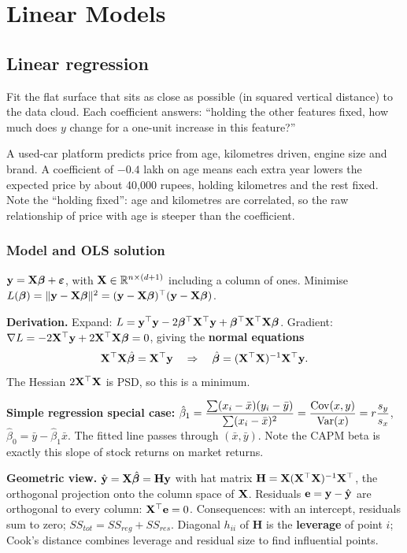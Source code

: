 \chapter{Linear Models}
\label{ch:linear}

\section{Linear regression}

\begin{intuition}
Fit the flat surface that sits as close as possible (in squared vertical distance) to the data cloud. Each coefficient answers: ``holding the other features fixed, how much does $y$ change for a one-unit increase in this feature?''
\end{intuition}

\begin{realworld}
A used-car platform predicts price from age, kilometres driven, engine size and brand. A coefficient of $-0.4$ lakh on age means each extra year lowers the expected price by about 40{,}000 rupees, holding kilometres and the rest fixed. Note the ``holding fixed'': age and kilometres are correlated, so the raw relationship of price with age is steeper than the coefficient.
\end{realworld}

\subsection{Model and OLS solution}
$\mathbf{y}=\mathbf{X}\bm{\beta}+\bm\varepsilon$, with $\mathbf{X}\in\mathbb{R}^{n\times(d+1)}$ including a column of ones. Minimise $L(\bm{\beta})=\|\mathbf{y}-\mathbf{X}\bm{\beta}\|^2=(\mathbf{y}-\mathbf{X}\bm{\beta})^\top(\mathbf{y}-\mathbf{X}\bm{\beta})$.

\textbf{Derivation.} Expand: $L=\mathbf{y}^\top\mathbf{y}-2\bm{\beta}^\top\mathbf{X}^\top\mathbf{y}+\bm{\beta}^\top\mathbf{X}^\top\mathbf{X}\bm{\beta}$. Gradient: $\nabla L=-2\mathbf{X}^\top\mathbf{y}+2\mathbf{X}^\top\mathbf{X}\bm{\beta}=0$, giving the \textbf{normal equations}
\[\mathbf{X}^\top\mathbf{X}\hat{\bm{\beta}}=\mathbf{X}^\top\mathbf{y}\quad\Rightarrow\quad\hat{\bm{\beta}}=(\mathbf{X}^\top\mathbf{X})^{-1}\mathbf{X}^\top\mathbf{y}.\]
The Hessian $2\mathbf{X}^\top\mathbf{X}$ is PSD, so this is a minimum.

\textbf{Simple regression special case:} $\hat\beta_1=\dfrac{\sum(x_i-\bar x)(y_i-\bar y)}{\sum(x_i-\bar x)^2}=\dfrac{\operatorname{Cov}(x,y)}{\operatorname{Var}(x)}=r\dfrac{s_y}{s_x}$, $\hat\beta_0=\bar y-\hat\beta_1\bar x$. The fitted line passes through $(\bar x,\bar y)$. Note the CAPM beta is exactly this slope of stock returns on market returns.

\textbf{Geometric view.} $\hat{\mathbf{y}}=\mathbf{X}\hat{\bm{\beta}}=\mathbf{H}\mathbf{y}$ with hat matrix $\mathbf{H}=\mathbf{X}(\mathbf{X}^\top\mathbf{X})^{-1}\mathbf{X}^\top$, the orthogonal projection onto the column space of $\mathbf{X}$. Residuals $\mathbf{e}=\mathbf{y}-\hat{\mathbf{y}}$ are orthogonal to every column: $\mathbf{X}^\top\mathbf{e}=0$. Consequences: with an intercept, residuals sum to zero; $SS_{tot}=SS_{reg}+SS_{res}$. Diagonal $h_{ii}$ of $\mathbf{H}$ is the \textbf{leverage} of point $i$; Cook's distance combines leverage and residual size to find influential points.

